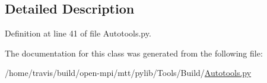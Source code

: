 \subsection{Detailed Description}


Definition at line 41 of file Autotools.\-py.



The documentation for this class was generated from the following file\-:\begin{DoxyCompactItemize}
\item 
/home/travis/build/open-\/mpi/mtt/pylib/\-Tools/\-Build/\hyperlink{_autotools_8py}{Autotools.\-py}\end{DoxyCompactItemize}
